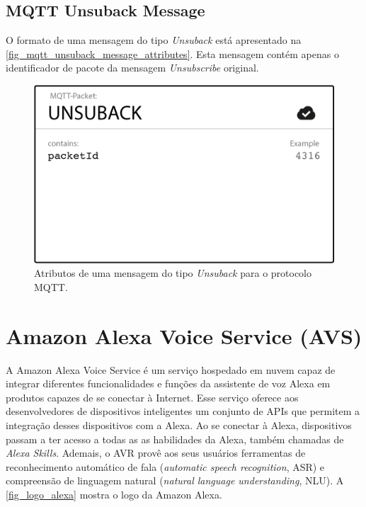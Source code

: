 \subsection{MQTT Unsuback Message}\label{subsection_mqtt_unsuback_message}
O formato de uma mensagem do tipo \textit{Unsuback} está apresentado na \autoref{fig_mqtt_unsuback_message_attributes}. Esta mensagem contém apenas o identificador de pacote da mensagem \textit{Unsubscribe} original.
\begin{figure}[htb]
	\begin{center}
		\caption{Atributos de uma mensagem do tipo \textit{Unsuback} para o protocolo MQTT.}\label{fig_mqtt_unsuback_message_attributes}
		\includegraphics[scale=0.5]{Imagens/mqtt_unsuback_message_attributes.png}
	\end{center}
\end{figure}

\section{Amazon Alexa Voice Service (AVS)}\label{section_amazon_alexa_voice_service}
A Amazon Alexa Voice Service é um serviço hospedado em nuvem capaz de integrar diferentes funcionalidades e funções da assistente de voz Alexa em produtos capazes de se conectar à Internet. Esse serviço oferece aos desenvolvedores de dispositivos inteligentes um conjunto de APIs que permitem a integração desses dispositivos com a Alexa. Ao se conectar à Alexa, dispositivos passam a ter acesso a todas as as habilidades da Alexa, também chamadas de \textit{Alexa Skills}. Ademais, o AVR provê aos seus usuários ferramentas de reconhecimento automático de fala (\textit{automatic speech recognition}, ASR) e compreensão de linguagem natural (\textit{natural language understanding}, NLU). A \autoref{fig_logo_alexa} mostra o logo da Amazon Alexa.

